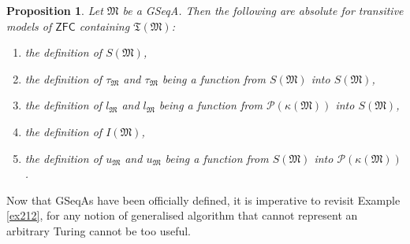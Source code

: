 \documentclass[12pt, twoside]{memoir}
\numberwithin{equation}{section}
\newtheorem{prop}[thm]{Proposition}
\theoremstyle{definition}
\theoremstyle{remark}
\theoremstyle{definition}
\theoremstyle{definition}
\theoremstyle{definition}
\theoremstyle{remark}
\begin{document}
\begin{prop}\label{prop226}
Let $\mathfrak{M}$ be a GSeqA. Then the following are absolute for transitive models of $\mathsf{ZFC}$ containing $\mathfrak{T}(\mathfrak{M})$:
\begin{enumerate}[label=(\arabic*)]
    \item the definition of $S(\mathfrak{M})$,
    \item the definition of $\tau_{\mathfrak{M}}$ and $\tau_{\mathfrak{M}}$ being a function from $S(\mathfrak{M})$ into $S(\mathfrak{M})$,
    \item the definition of $l_{\mathfrak{M}}$ and $l_{\mathfrak{M}}$ being a function from $\mathcal{P}(\kappa(\mathfrak{M}))$ into $S(\mathfrak{M})$,
    \item the definition of $I(\mathfrak{M})$,
    \item the definition of $u_{\mathfrak{M}}$ and $u_{\mathfrak{M}}$ being a function from $S(\mathfrak{M})$ into $\mathcal{P}(\kappa(\mathfrak{M}))$. 
\end{enumerate}
\end{prop}

Now that GSeqAs have been officially defined, it is imperative to revisit Example \ref{ex212}, for any notion of generalised algorithm that cannot represent an arbitrary Turing cannot be too useful.
\end{document}
